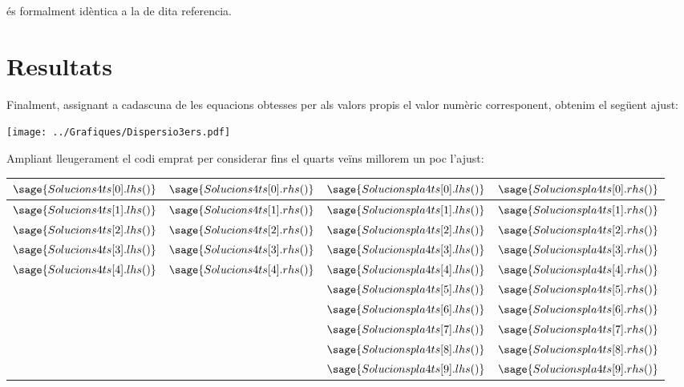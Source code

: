 \documentclass[12pt]{article} %
\begin{document}
{és formalment idèntica a la de dita referencia.

\section{Resultats}

Finalment, assignant a cadascuna de les equacions obtesses per als valors propis el valor numèric corresponent, obtenim el següent ajust:

\begin{center}
\texttt{[image: ../Grafiques/Dispersio3ers.pdf]}
\end{center}

Ampliant lleugerament el codi emprat per considerar fins el quarts veïns millorem un poc l'ajust:

\begin{center}
\begin{tabular}{|c|c||c|c|}\hline
$\sage{Solucions4ts[0].lhs()}$ & $\sage{Solucions4ts[0].rhs()}$ & $\sage{Solucionspla4ts[0].lhs()}$ & $\sage{Solucionspla4ts[0].rhs()}$  \\ \hline
$\sage{Solucions4ts[1].lhs()}$ & $\sage{Solucions4ts[1].rhs()}$ & $\sage{Solucionspla4ts[1].lhs()}$ & $\sage{Solucionspla4ts[1].rhs()}$  \\ \hline
$\sage{Solucions4ts[2].lhs()}$ & $\sage{Solucions4ts[2].rhs()}$ & $\sage{Solucionspla4ts[2].lhs()}$ & $\sage{Solucionspla4ts[2].rhs()}$  \\ \hline
$\sage{Solucions4ts[3].lhs()}$ & $\sage{Solucions4ts[3].rhs()}$ & $\sage{Solucionspla4ts[3].lhs()}$ & $\sage{Solucionspla4ts[3].rhs()}$  \\ \hline
$\sage{Solucions4ts[4].lhs()}$ & $\sage{Solucions4ts[4].rhs()}$ & $\sage{Solucionspla4ts[4].lhs()}$ & $\sage{Solucionspla4ts[4].rhs()}$  \\ \hline
  &  & $\sage{Solucionspla4ts[5].lhs()}$ & $\sage{Solucionspla4ts[5].rhs()}$  \\ \hline
  &  & $\sage{Solucionspla4ts[6].lhs()}$ & $\sage{Solucionspla4ts[6].rhs()}$  \\ \hline
  &  & $\sage{Solucionspla4ts[7].lhs()}$ & $\sage{Solucionspla4ts[7].rhs()}$  \\ \hline
  &  & $\sage{Solucionspla4ts[8].lhs()}$ & $\sage{Solucionspla4ts[8].rhs()}$  \\ \hline
  &  & $\sage{Solucionspla4ts[9].lhs()}$ & $\sage{Solucionspla4ts[9].rhs()}$  \\ \hline
\end{tabular}
\end{center}

}
\end{document}
